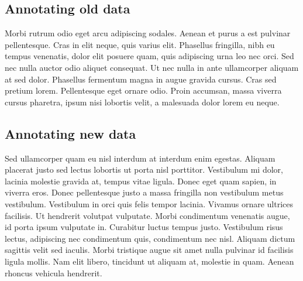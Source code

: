 \subsection{Annotating old data}
Morbi rutrum odio eget arcu adipiscing sodales. Aenean et purus a est
pulvinar pellentesque. Cras in elit neque, quis varius elit. Phasellus
fringilla, nibh eu tempus venenatis, dolor elit posuere quam, quis
adipiscing urna leo nec orci. Sed nec nulla auctor odio aliquet
consequat. Ut nec nulla in ante ullamcorper aliquam at sed
dolor. Phasellus fermentum magna in augue gravida cursus. Cras sed
pretium lorem. Pellentesque eget ornare odio. Proin accumsan, massa
viverra cursus pharetra, ipsum nisi lobortis velit, a malesuada dolor
lorem eu neque.


\subsection{Annotating new data}

Sed ullamcorper quam eu nisl interdum at interdum enim
egestas. Aliquam placerat justo sed lectus lobortis ut porta nisl
porttitor. Vestibulum mi dolor, lacinia molestie gravida at, tempus
vitae ligula. Donec eget quam sapien, in viverra eros. Donec
pellentesque justo a massa fringilla non vestibulum metus
vestibulum. Vestibulum in orci quis felis tempor lacinia. Vivamus
ornare ultrices facilisis. Ut hendrerit volutpat vulputate. Morbi
condimentum venenatis augue, id porta ipsum vulputate in. Curabitur
luctus tempus justo. Vestibulum risus lectus, adipiscing nec
condimentum quis, condimentum nec nisl. Aliquam dictum sagittis velit
sed iaculis. Morbi tristique augue sit amet nulla pulvinar id
facilisis ligula mollis. Nam elit libero, tincidunt ut aliquam at,
molestie in quam. Aenean rhoncus vehicula hendrerit.

